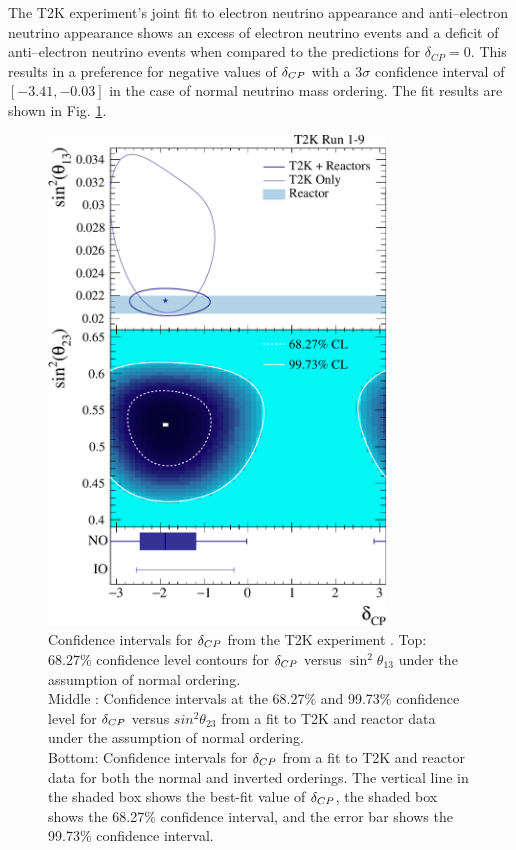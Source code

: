 {The T2K experiment's joint fit to electron neutrino appearance and 
anti--electron neutrino appearance shows an excess of electron neutrino events 
and a deficit of anti--electron neutrino events when compared to the 
predictions for \(\delta_{CP} = 0\). This results in a preference for negative 
values of $\delta_{CP}$ with a \(3\sigma\) confidence interval of \([-3.41, -0.03]\) 
in the case of normal neutrino mass ordering. The fit results are shown in 
Fig. \ref{fig:t2k_cp}. \cite{Abe2019}
\begin{figure}
	\centering
	\includegraphics[width=0.8\textwidth]{figures/t2k_cp.pdf}
	\caption{Confidence intervals for $\delta_{CP}$ from the T2K experiment 
	\cite{Abe2019}. 
	Top: 68.27\% confidence level contours for $\delta_{CP}$ versus $\sin^2\theta_{13}$ 
	under the assumption of normal ordering. \\
	Middle : Confidence intervals at the 68.27\% and 99.73\% confidence level for 
	$\delta_{CP}$ versus $sin^2\theta_{23}$ from a fit to T2K and reactor data under the 
	assumption of normal ordering. \\
	Bottom: Confidence intervals for $\delta_{CP}$ from a fit to T2K and reactor data for 
	both the normal and inverted orderings. The vertical line in the shaded box 
	shows the best-fit value of $\delta_{CP}$, the shaded box shows the 68.27\% 
	confidence interval, and the error bar shows the 99.73\% confidence interval. 
	}
	\label{fig:t2k_cp}
\end{figure}

}
